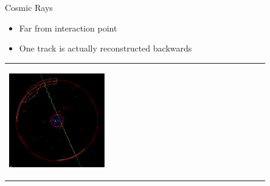 \begin{slide*}
\slideframe{}
\begin{minipage}[t]{\linewidth}
\Large

\vspace{0.2 cm}

{\huge Cosmic Rays}
\begin{itemize}
  \item Far from interaction point
  \item One track is actually reconstructed backwards
\end{itemize}
\begin{center}
  \begin{tabular}{p{0.4\linewidth} c p{0.45\linewidth}}
    \begin{minipage}{\linewidth}
      \begin{center}
	\includegraphics[width=\linewidth]{cosmic_event.eps}
      \end{center}
    \end{minipage} & &
    \begin{minipage}{\linewidth}

\end{minipage}
\end{tabular}
\end{center}
\end{minipage}
\end{slide*}
